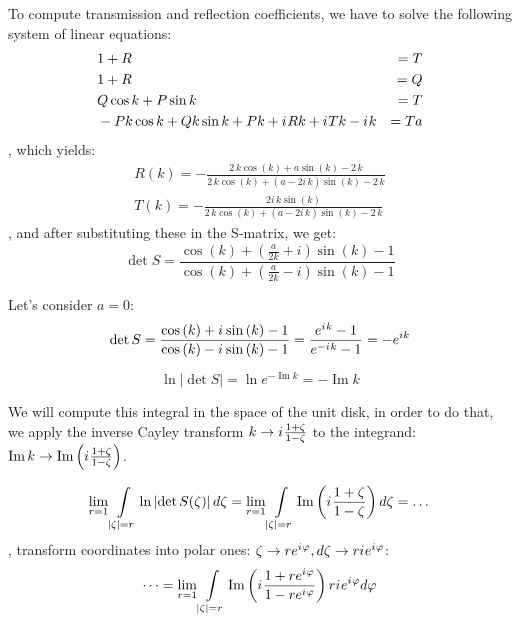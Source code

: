 \documentclass{birkjour}
\theoremstyle{definition}
\theoremstyle{remark}
\numberwithin{equation}{section}
\newcommand{\eexp}[1]{e^{#1}}
\newcommand{\iu}{{i\mkern1mu}}
\renewcommand{\Im}{\operatorname{Im}}
\renewcommand{\phi}{\varphi}
\begin{document}
To compute transmission and reflection coefficients, we have to solve the following system of linear equations:
\begin{align*}
& 1 + R &= T \\
& 1 + R &= Q \\
& Q \cos k + P \sin k &= T \\
& -P k \cos k + Q k \sin k + P k + \iu R k + \iu T k - \iu k &= T a
\end{align*}
, which yields:
\begin{align*}
R(k) = -\frac{2 \, k \cos\left(k\right) + a \sin\left(k\right) - 2 \, k}{2 \, k \cos\left(k\right) + {\left(a - 2 i \, k\right)} \sin\left(k\right) - 2 \, k} \\
T(k) = -\frac{2 i \, k \sin\left(k\right)}{2 \, k \cos\left(k\right) + {\left(a - 2 i \, k\right)} \sin\left(k\right) - 2 \, k}
\end{align*}
, and after substituting these in the S-matrix, we get:
\[
\det S = 
\frac
{\cos\left(k\right) + {\left(\frac{a}{2 k} + i\right)} \sin\left(k\right) - 1}
{\cos\left(k\right) + {\left(\frac{a}{2 k} - i\right)} \sin\left(k\right) - 1}
\]


Let's consider $a=0$:
\[
\det S
= \frac
{\cos\left(k\right) + \iu \sin\left(k\right) - 1}
{\cos\left(k\right) - \iu \sin\left(k\right) - 1}
= \frac{\eexp{\iu k} - 1}{\eexp{-\iu k} - 1}
= -\eexp{i k}
\]

\[
\ln \left|{\det S}\right| = \ln \eexp{- \Im k} = -\Im k
\]

We will compute this integral in the space of the unit disk, in order to do that, we apply the inverse Cayley transform $k \to \iu \frac{1 + \zeta}{1 - \zeta}$ to the integrand: $\Im k \to \Im \left( \iu \frac{1 + \zeta}{1 - \zeta} \right) $.

\[
  \lim\limits_{r = 1} \int\limits_{\left|\zeta\right| = r} \ln \left|\det S(\zeta)\right| d \zeta
= \lim\limits_{r = 1} \int\limits_{\left|\zeta\right| = r} \Im \left( \iu \frac{1 + \zeta}{1 - \zeta} \right)  d\zeta = \dots
\]
, transform coordinates into polar ones: $\zeta \to r \eexp{\iu \phi}, d\zeta \to r \iu \eexp{\iu \phi}$:
\[
\dots = \lim\limits_{r = 1} \int\limits_{\left|\zeta\right| = r} \Im \left( \iu \frac{1 + r \eexp{\iu \phi}}{1 - r \eexp{\iu \phi}} \right) r \iu \eexp{\iu \phi} d\phi
\]
\end{document}
